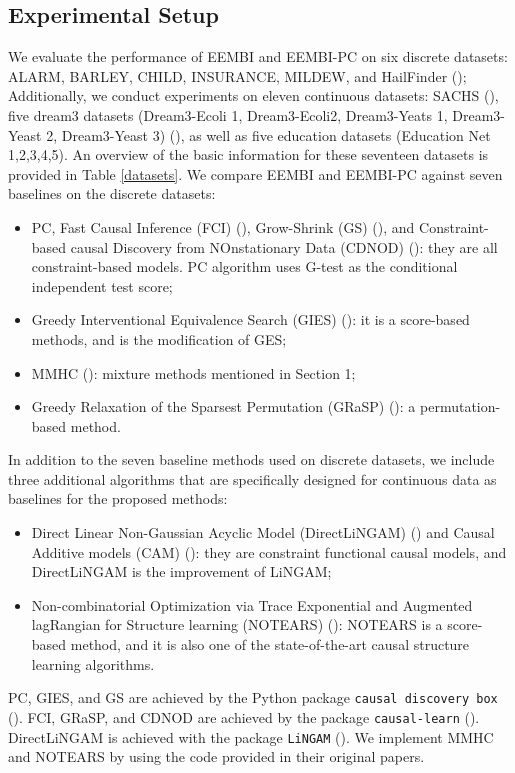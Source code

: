 \documentclass[twoside,11pt]{article}
\begin{document}
\subsection{Experimental Setup}
We evaluate the performance of EEMBI and EEMBI-PC on six discrete datasets: ALARM, BARLEY, CHILD, INSURANCE, MILDEW, and HailFinder (\cite{bnlearn}); Additionally, we conduct experiments on eleven continuous datasets: SACHS (\cite{sachs2005causal}), five dream3 datasets (Dream3-Ecoli 1, Dream3-Ecoli2, Dream3-Yeats 1, Dream3-Yeast 2, Dream3-Yeast 3) (\cite{dream3}), as well as five education datasets (Education Net 1,2,3,4,5). An overview of the basic information for these seventeen datasets is provided in Table \ref{datasets}. We compare EEMBI and EEMBI-PC against seven baselines on the discrete datasets: 
\begin{itemize}
    \item PC, Fast Causal Inference (FCI) (\cite{10.5555/2074158.2074215}), Grow-Shrink (GS) (\cite{margaritis2003learning}), and Constraint-based causal Discovery from NOnstationary Data (CDNOD) (\cite{huang2020causal}): they are all constraint-based models. PC algorithm uses G-test as the conditional independent test score;
    \item Greedy Interventional Equivalence Search (GIES) (\cite{hauser2012characterization}): it is a score-based methods, and is the modification of GES;
    \item MMHC (\cite{tsamardinos2006max}): mixture methods mentioned in Section 1;
    \item Greedy Relaxation of the Sparsest Permutation (GRaSP) (\cite{lam2022greedy}): a permutation-based method. 
\end{itemize} 
In addition to the seven baseline methods used on discrete datasets, we include three additional algorithms that are specifically designed for continuous data as baselines for the proposed methods:
\begin{itemize}
    \item Direct Linear Non-Gaussian Acyclic Model (DirectLiNGAM) (\cite{shimizu2011directlingam}) and Causal Additive models (CAM) (\cite{buhlmann2014cam}): they are constraint functional causal models, and DirectLiNGAM is the improvement of LiNGAM;
    \item Non-combinatorial Optimization via Trace Exponential and Augmented lagRangian for Structure learning (NOTEARS) (\cite{zheng2018dags}): NOTEARS is a score-based method, and it is also one of the state-of-the-art causal structure learning algorithms. 
\end{itemize} 
PC, GIES, and GS are achieved by the Python package \texttt{causal discovery box} (\cite{cdt}). FCI, GRaSP, and CDNOD are achieved by the package \texttt{causal-learn} (\cite{causal-learn}). DirectLiNGAM is achieved with the package \texttt{LiNGAM} (\cite{LiNGAM}). We implement MMHC and NOTEARS by using the code provided in their original papers. 
\end{document}
